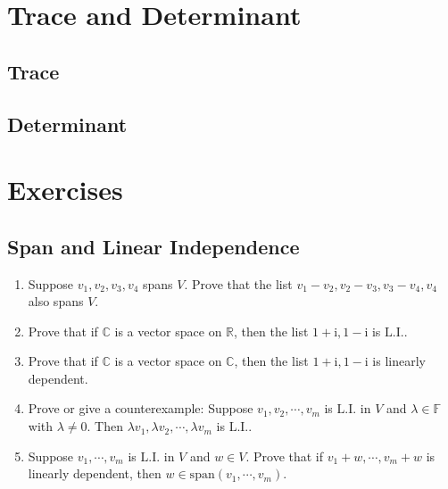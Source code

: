 \documentclass[11pt, letterpaper]{article}
\def\R{\mathbb{R}}
\def\C{\mathbb{C}}
\def\F{\mathbb{F}}
\def\i{\mathrm{i}}
\def\LI{\mathrm{L.I.}}
\def\span{\mathrm{span}}
\begin{document}
\newpage
\section{Trace and Determinant}
\subsection{Trace}

\newpage
\subsection{Determinant}

\newpage
\section{Exercises}
\subsection{Span and Linear Independence}
\begin{enumerate}
	\item Suppose $v_1,v_2,v_3,v_4$ spans $V$. Prove that the list $v_1-v_2,v_2-v_3,v_3-v_4,v_4$ also spans $V$.
	\item Prove that if $\C$ is a vector space on $\R$, then the list $1+\i,1-\i$ is $\LI$. 
	\item Prove that if $\C$ is a vector space on $\C$, then the list $1+\i,1-\i$ is linearly dependent.
	\item Prove or give a counterexample: Suppose $v_1,v_2,\cdots,v_m$ is $\LI$ in $V$ and $\lambda\in\F$ with $\lambda\neq0.$ Then $\lambda v_1,\lambda v_2,\cdots,\lambda v_m$ is $\LI$.
	\item Suppose $v_1,\cdots,v_m$ is $\LI$ in $V$ and $w\in V$. Prove that if $v_1+w,\cdots,v_m+w$ is linearly dependent, then $w\in\span(v_1,\cdots,v_m).$
\end{enumerate}
\end{document}
